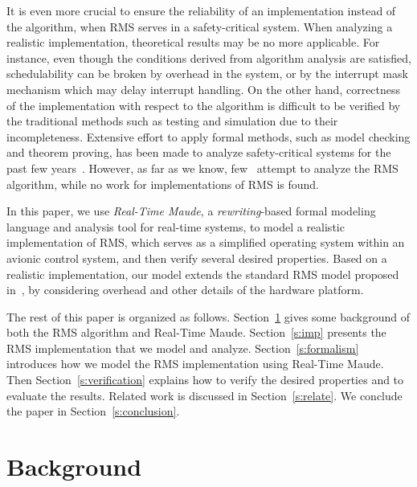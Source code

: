 \documentclass[10pt,journal]{IEEEtran}
\begin{document}
It is even more crucial to ensure the reliability of an implementation
instead of the algorithm, when RMS serves in a safety-critical
system. When analyzing a realistic implementation, theoretical results
may be no more applicable. For instance, even though the conditions
derived from algorithm analysis are satisfied, schedulability can be
broken by overhead in the system, or by the interrupt mask mechanism
which may delay interrupt handling. On the other hand, correctness of
the implementation with respect to the algorithm is difficult to be
verified by the traditional methods such as testing and simulation due
to their incompleteness. Extensive effort to apply formal methods,
such as model checking and theorem proving, has been made to analyze
safety-critical systems for the past few
years~\cite{DBLP:journals/tie/MiyawakiMSYV05,DBLP:journals/iandc/MeseguerR13,DBLP:journals/cacm/Leroy09,DBLP:conf/sosp/KleinEHACDEEKNSTW09}. However,
as far as we know, few~\cite{DBLP:conf/iceccs/CuiDT14,TianD2011}
attempt to analyze the RMS algorithm, while no work for
implementations of RMS is found.

In this paper, we use \emph{Real-Time Maude}, a \emph{rewriting}-based
formal modeling language and analysis tool for real-time systems, to
model a realistic implementation of RMS, which serves as a simplified
operating system within an avionic control system, and then verify
several desired properties. Based on a realistic implementation, our
model extends the standard RMS model proposed
in~\cite{DBLP:journals/jacm/LiuL73}, by considering overhead and other
details of the hardware platform.

The rest of this paper is organized as
follows. Section~\ref{s:background} gives some background of both the
RMS algorithm and Real-Time Maude.  Section~\ref{s:imp} presents the
RMS implementation that we model and analyze.
Section~\ref{s:formalism} introduces how we model the RMS
implementation using Real-Time Maude. Then
Section~\ref{s:verification} explains how to verify the desired
properties and to evaluate the results. Related work is discussed in
Section~\ref{s:relate}. We conclude the paper in
Section~\ref{s:conclusion}.

\section{Background}
\label{s:background}
\end{document}
